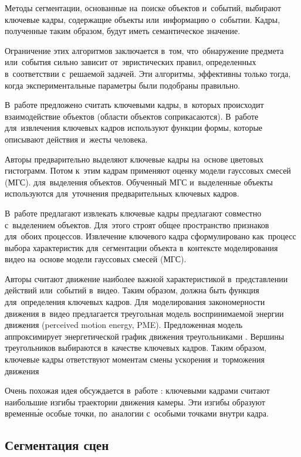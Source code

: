 Методы сегментации, основанные на~поиске объектов и~событий, выбирают
ключевые кадры, содержащие объекты или~информацию о~событии.
Кадры, полученные таким образом, будут иметь семантическое значение.

Ограничение этих алгоритмов заключается в~том,
что~обнаружение предмета или~события сильно зависит
от~эвристических правил, определенных в~соответствии с~решаемой задачей.
Эти алгоритмы, эффективны только тогда,
когда экспериментальные параметры были подобраны правильно.

В~работе \cite{Calic:2004} предложено считать ключевыми кадры,
в~которых происходит взаимодействие объектов (области объектов соприкасаются).
В~работе \cite{Kim:2001} для~извлечения ключевых кадров
используют функции формы, которые описывают действия и~жесты человека.

Авторы \cite{Liu:2005} предварительно выделяют ключевые кадры
на~основе цветовых гистограмм. Потом к~этим кадрам применяют
оценку модели гауссовых смесей
(МГС).
для~выделения объектов. Обученный МГС и~выделенные объекты
используются для~уточнения предварительных ключевых кадров.

В~работе \cite{Song:2006} предлагают извлекать ключевые кадры предлагают
совместно с~выделением объектов.
Для~этого строят общее пространство признаков для~обоих процессов.
Извлечение ключевого кадра сформулировано как~процесс выбора характеристик
для~сегментации объекта в~контексте моделирования видео на~основе
модели гауссовых смесей (МГС).

Авторы \cite{Liu:2003} считают движение наиболее важной характеристикой
в~представлении действий или~событий в~видео.
Таким образом, должна быть функция для~определения ключевых кадров.
Для~моделирования закономерности движения в~видео
предлагается {треугольная модель}
воспринимаемой энергии движения
(perceived motion energy, PME).
Предложенная модель аппроксимирует энергетической
график движения треугольниками \cite{Zhang:2008}.
Вершины треугольников выбираются в~качестве ключевых кадров.
Таким образом, ключевые кадры ответствуют моментам смены
ускорения и~торможения движения

Очень похожая идея обсуждается в~работе \cite{Han:2005}:
ключевыми кадрами считают наибольшие изгибы траектории движения камеры.
Эти изгибы образуют временны́е особые точки,
по~аналогии с~особыми точками внутри кадра.


\subsection{Сегментация сцен}

